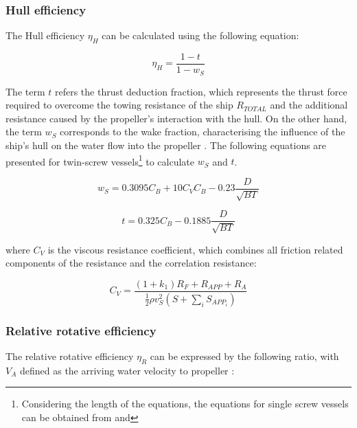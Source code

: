 \subsubsection*{Hull efficiency}

The Hull efficiency $\eta_H$ can be calculated using the following equation:

\begin{equation}
    \label{eqn:hull_eff}
    \eta_H = \frac{1 - t}{1 - w_S}
\end{equation}

The term $t$ refers the thrust deduction fraction, which represents the thrust force required to overcome the towing resistance of the ship $R_{TOTAL}$ and the additional resistance caused by the propeller's interaction with the hull. On the other hand, the term $w_S$ corresponds to the wake fraction, characterising the influence of the ship's hull on the water flow into the propeller . The following equations are presented for twin-screw vessels\footnote{Considering the length of the equations, the equations for single screw vessels can be obtained from  and } to calculate $w_S$ and $t$.

\begin{equation}
    \label{eqn:wake_ws}
    w_S = 0.3095 C_B + 10 C_V C_B -0.23 \frac{D}{\sqrt{BT}}
\end{equation}

\begin{equation}
    \label{eqn:thrust_t}
    t = 0.325 C_B - 0.1885 \frac{D}{\sqrt{BT}}
\end{equation}

where $C_V$ is the viscous resistance coefficient, which combines all friction related components of the resistance and the correlation resistance:

\begin{equation}
    \label{eqn:C_V}
    C_V = \frac{(1+k_1)R_F+R_{APP}+R_A}{\frac{1}{2}\rho v_S^2 (S+\sum_i S_{APP_i})}
\end{equation}

\subsubsection*{Relative rotative efficiency}

The relative rotative efficiency $\eta_R$ can be expressed by the following ratio, with $V_A$ defined as the arriving water velocity to propeller :

